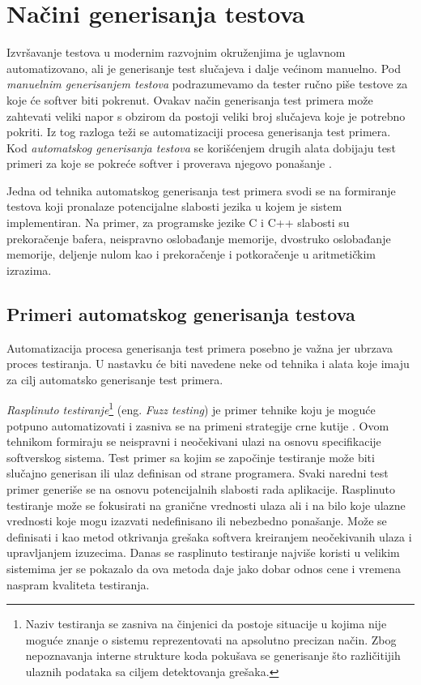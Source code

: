 \documentclass[12pt,oneside]{memoir}
\begin{document}
\section{Načini generisanja testova} \label{broj5}

Izvršavanje testova u modernim razvojnim okruženjima je uglavnom automatizovano, ali je generisanje test slučajeva i dalje većinom manuelno. Pod \emph{manuelnim generisanjem testova} podrazumevamo da tester ručno piše testove za koje će softver biti pokrenut. Ovakav način generisanja test primera može zahtevati veliki napor s obzirom da postoji veliki broj slučajeva koje je potrebno pokriti. Iz tog razloga teži se automatizaciji procesa generisanja test primera. Kod \emph{automatskog generisanja testova} se korišćenjem drugih alata dobijaju test primeri za koje se pokreće softver i proverava njegovo ponašanje \cite{AutomatedTestGeneration}. \par
Jedna od tehnika automatskog generisanja test primera svodi se na formiranje testova koji pronalaze potencijalne slabosti jezika u kojem je sistem implementiran.
Na primer, za programske jezike C i C++ slabosti su prekoračenje bafera, neispravno oslobađanje memorije, dvostruko oslobađanje memorije, deljenje nulom kao i prekoračenje i potkoračenje u aritmetičkim izrazima.


\subsection{Primeri automatskog generisanja testova}
Automatizacija procesa generisanja test primera posebno je važna jer ubrzava proces testiranja. U nastavku će biti navedene neke od tehnika i alata koje imaju za cilj automatsko generisanje test primera. 


\emph{Rasplinuto testiranje}\footnote{Naziv testiranja se zasniva na činjenici da postoje situacije u kojima nije moguće znanje o sistemu reprezentovati na apsolutno precizan način. Zbog nepoznavanja interne strukture koda pokušava se generisanje što različitijih ulaznih podataka sa ciljem detektovanja grešaka.} (eng. \textit{Fuzz testing}) je primer tehnike koju je moguće potpuno automatizovati i zasniva se na primeni strategije crne kutije \cite{FuzzTestingForDummies}. 
Ovom tehnikom formiraju se neispravni i neočekivani ulazi na osnovu specifikacije softverskog sistema.
Test primer sa kojim se započinje testiranje može biti slučajno generisan ili ulaz definisan od strane programera. Svaki naredni test primer generiše se na osnovu potencijalnih slabosti rada aplikacije. Rasplinuto testiranje može se fokusirati na granične vrednosti ulaza ali i na bilo koje ulazne vrednosti koje mogu izazvati nedefinisano ili nebezbedno ponašanje. Može se definisati i kao metod otkrivanja grešaka softvera kreiranjem neočekivanih ulaza i upravljanjem izuzecima. Danas se rasplinuto testiranje najviše koristi u velikim sistemima jer se pokazalo da ova metoda daje jako dobar odnos cene i vremena naspram kvaliteta testiranja. 
\par
\end{document}

